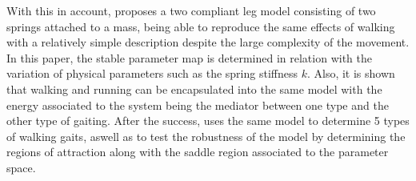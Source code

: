 With this in account, \cite{Seyfarth et al. 2006} proposes a two compliant leg model consisting of two springs attached to a mass, being able to reproduce the same effects of walking with a relatively simple description despite the large complexity of the movement. In this paper, the stable parameter map is determined in relation with the variation of physical parameters such as the spring stiffness $k$. Also, it is shown that walking and running can be encapsulated into the same model with the energy associated to the system being the mediator between one type and the other type of gaiting.  After the success, \cite{Rummel et al. 2010} uses the same model to determine 5 types of walking gaits, aswell as to test the robustness of the model by determining the regions of attraction along with the saddle region associated to the parameter space.






